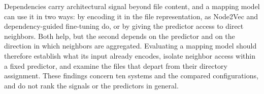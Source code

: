 Dependencies carry architectural signal beyond file content, and a mapping model can use it in two ways: by encoding it in the file representation, as Node2Vec and dependency-guided fine-tuning do, or by giving the predictor access to direct neighbors. Both help, but the second depends on the predictor and on the direction in which neighbors are aggregated. Evaluating a mapping model should therefore establish what its input already encodes, isolate neighbor access within a fixed predictor, and examine the files that depart from their directory assignment. These findings concern ten systems and the compared configurations, and do not rank the signals or the predictors in general.
